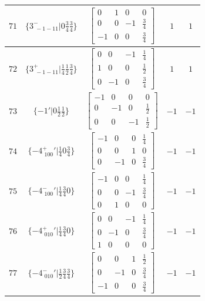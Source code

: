 \documentclass[fleqn,8pt]{jsarticle}
\begin{document}
\begin{longtable}{ccccc}
$ 71 $ & $ \{3^{-}_{\,\,-1-11}|0 \frac{3}{4} \frac{3}{4}\} $ & $ \begin{bmatrix} 0 & 1 & 0 & 0 \\ 0 & 0 & -1 & \frac{3}{4} \\ -1 & 0 & 0 & \frac{3}{4} \end{bmatrix} $ & $ 1 $ & $ 1 $ \\ \hline
$ 72 $ & $ \{3^{+}_{\,\,-1-11}|\frac{1}{4} \frac{1}{2} \frac{3}{4}\} $ & $ \begin{bmatrix} 0 & 0 & -1 & \frac{1}{4} \\ 1 & 0 & 0 & \frac{1}{2} \\ 0 & -1 & 0 & \frac{3}{4} \end{bmatrix} $ & $ 1 $ & $ 1 $ \\ \hline
$ 73 $ & $ \{-1{}'|0 \frac{1}{2} \frac{1}{2}\} $ & $ \begin{bmatrix} -1 & 0 & 0 & 0 \\ 0 & -1 & 0 & \frac{1}{2} \\ 0 & 0 & -1 & \frac{1}{2} \end{bmatrix} $ & $ -1 $ & $ -1 $ \\ \hline
$ 74 $ & $ \{-4^{+}_{\,\,100}{}'|\frac{1}{4} 0 \frac{3}{4}\} $ & $ \begin{bmatrix} -1 & 0 & 0 & \frac{1}{4} \\ 0 & 0 & 1 & 0 \\ 0 & -1 & 0 & \frac{3}{4} \end{bmatrix} $ & $ -1 $ & $ -1 $ \\ \hline
$ 75 $ & $ \{-4^{-}_{\,\,100}{}'|\frac{1}{4} \frac{3}{4} 0\} $ & $ \begin{bmatrix} -1 & 0 & 0 & \frac{1}{4} \\ 0 & 0 & -1 & \frac{3}{4} \\ 0 & 1 & 0 & 0 \end{bmatrix} $ & $ -1 $ & $ -1 $ \\ \hline
$ 76 $ & $ \{-4^{+}_{\,\,010}{}'|\frac{1}{4} \frac{3}{4} 0\} $ & $ \begin{bmatrix} 0 & 0 & -1 & \frac{1}{4} \\ 0 & -1 & 0 & \frac{3}{4} \\ 1 & 0 & 0 & 0 \end{bmatrix} $ & $ -1 $ & $ -1 $ \\ \hline
$ 77 $ & $ \{-4^{-}_{\,\,010}{}'|\frac{1}{2} \frac{3}{4} \frac{3}{4}\} $ & $ \begin{bmatrix} 0 & 0 & 1 & \frac{1}{2} \\ 0 & -1 & 0 & \frac{3}{4} \\ -1 & 0 & 0 & \frac{3}{4} \end{bmatrix} $ & $ -1 $ & $ -1 $ \\ \hline

\end{longtable}
\end{document}
